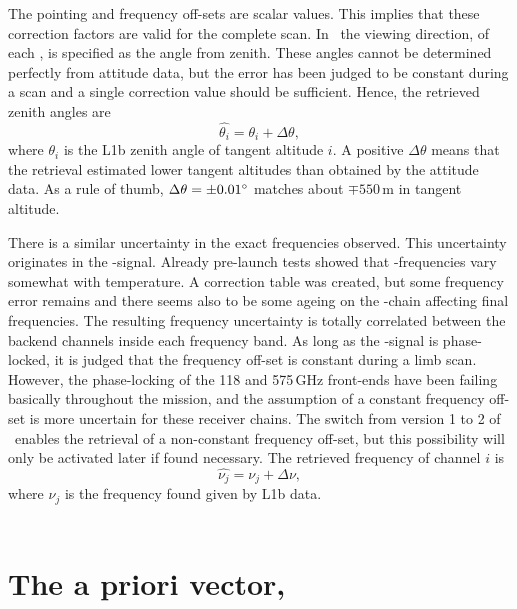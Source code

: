 The pointing and frequency off-sets are scalar values. This implies that these
correction factors are valid for the complete scan. In \ARTS\ the viewing
direction, of each \LOS, is specified as the angle from zenith. These angles
cannot be determined perfectly from attitude data, but the error has been
judged to be constant during a scan and a single correction value should be
sufficient. Hence, the retrieved zenith angles are
\begin{equation}
  \label{eq:retr:point}
  \hat{\theta_i} = \theta_i + \Delta\theta,  
\end{equation}
where $\theta_i$ is the L1b zenith angle of tangent altitude $i$. A positive 
$\Delta\theta$ means that the retrieval estimated lower tangent altitudes than
obtained by the attitude data. As a rule of thumb, $\Delta\theta=\pm0.01^\circ$
matches about $\mp550$\,m in tangent altitude.

There is a similar uncertainty in the exact frequencies observed. This
uncertainty originates in the \LO-signal. Already pre-launch tests showed that
\LO-frequencies vary somewhat with temperature. A correction table was created,
but some frequency error remains and there seems also to be some ageing on the
\LO-chain affecting final frequencies. The resulting frequency uncertainty is
totally correlated between the backend channels inside each frequency band. As
long as the \LO-signal is phase-locked, it is judged that the frequency off-set
is constant during a limb scan. However, the phase-locking of the 118 and
575\,GHz front-ends have been failing basically throughout the mission, and the
assumption of a constant frequency off-set is more uncertain for these receiver
chains. The switch from version 1 to 2 of \ARTS\ enables the retrieval of a
non-constant frequency off-set, but this possibility will only be activated later
if found necessary. The retrieved frequency of channel $i$ is
\begin{equation}
  \label{eq:retr:freq}
  \hat{\nu_j} = \nu_j + \Delta\nu,  
\end{equation}
where $\nu_j$ is the frequency found given by L1b data.\\
\\


\section{The a priori vector, }
\label{sec:xa}
%

